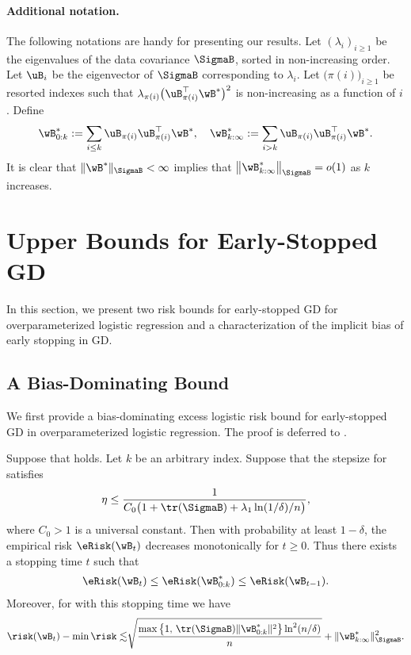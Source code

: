 \documentclass[11pt]{article}
\begin{document}
\paragraph{Additional notation.}
The following notations are handy for presenting our results.
Let $(\lambda_i)_{i\ge 1}$ be the eigenvalues of the data covariance $\SigmaB$, sorted in non-increasing order. Let $\uB_i$ be the eigenvector of $\SigmaB$ corresponding to $\lambda_i$.
Let $\big(\pi(i)\big)_{i\ge 1}$ be resorted indexes
such that $\lambda_{\pi(i)}\big(\uB_{\pi(i)}^\top \wB^*\big)^2$ is non-increasing as a function of $i$. Define 
\[
\wB^*_{0:k} := \sum_{i\le k} \uB_{\pi(i)}\uB_{\pi(i)}^\top \wB^*,\quad 
\wB^*_{k:\infty} := \sum_{i> k} \uB_{\pi(i)}\uB_{\pi(i)}^\top \wB^*.
\]
It is clear that $\|\wB^*\|_{\SigmaB} < \infty$ implies that $\big\|\wB^*_{k:\infty}\big\|_{\SigmaB} = o(1)$ as $k$ increases.

\section{Upper Bounds for Early-Stopped GD}\label{sec:upper-bound}
In this section, we present two risk bounds for early-stopped GD for overparameterized logistic regression and a characterization of the implicit bias of early stopping in GD.

\subsection{A Bias-Dominating Bound}
We first provide a bias-dominating excess logistic risk bound for early-stopped GD in overparameterized logistic regression.
The proof is deferred to .

\begin{theorem}\label{thm:gd:upper-bound}
Suppose that  holds.
Let $k$ be an arbitrary index.
Suppose that the stepsize for  satisfies
\[\eta\le \frac{1}{C_0\big( 1+\tr(\SigmaB)+\lambda_1\ln(1/\delta)/n\big) },\]
where $C_0>1$ is a universal constant. Then with probability at least $1-\delta$, the empirical risk $\eRisk(\wB_t)$ decreases monotonically for $t\ge 0$. Thus there exists a stopping time $t$ such that 
\begin{align*}
\eRisk(\wB_t)\le \eRisk(\wB^*_{0:k}) \le \eRisk(\wB_{t-1}).
\end{align*}
Moreover, 
for  with this stopping time we have
\begin{align*}
{\risk(\wB_t)-\min\risk \lesssim } 
  \sqrt{\frac{ \max\big\{1,\, \tr(\SigmaB)\|\wB^*_{0:k}\|^2 \big\}\ln^2(n/\delta)}{n}} 
+\|\wB^*_{k:\infty}\|^2_{\SigmaB}.
\end{align*}
\end{theorem}
\end{document}

